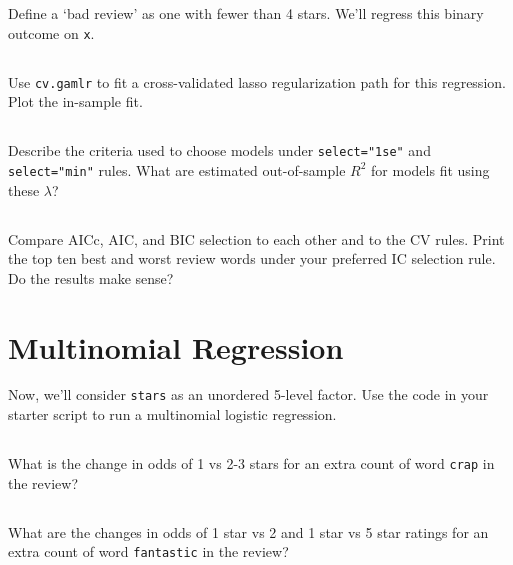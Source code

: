 \documentclass[12pt]{article}
\begin{document}
Define a `bad review' as one with fewer than 4 stars.  We'll regress this binary outcome on {\tt x}.  

\subsection{} Use {\tt cv.gamlr} to fit a cross-validated lasso 
regularization path for this regression.  \\Plot the in-sample fit.

\subsection{} Describe the criteria used to choose models under {\tt select="1se"} and {\tt select="min"} rules.  What are estimated out-of-sample $R^2$ for models fit using these $\lambda$?

\subsection{} Compare AICc, AIC, and BIC selection to each other and to the CV rules.  Print the top ten best and worst review words under your preferred IC selection rule.  Do the results make sense?


\newpage
\section{Multinomial Regression}

Now, we'll consider {\tt stars} as an unordered 5-level factor.  Use the code in your starter script to run a multinomial logistic regression.
\subsection{} What is the change in odds of 1 vs 2-3 stars for an extra count of word {\tt crap} in the review? 
\subsection{} What are the changes in odds of 1 star vs 2 and 1 star vs 5 star ratings for an extra count of word {\tt fantastic} in the review?
\end{document}
